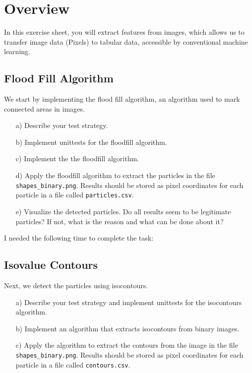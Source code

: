 \documentclass{article}
\begin{document}
\thispagestyle{page1} 

\section{Overview}

In this exercise sheet, you will extract features from images, which allows us to transfer image data (Pixels) to tabular data, accessible by conventional machine learning.

\subsection{Flood Fill Algorithm}

We start by implementing the flood fill algorithm, an algorithm used to mark connected areas in images. 

\begin{enumerate}

\item[a)] Describe your test strategy.

\item[b)] Implement unittests for the floodfill algorithm.

\item[c)] Implement the the floodfill algorithm.

\item[d)] Apply the floodfill algorithm to extract the particles in the file \texttt{shapes\_binary.png}. Results should be stored as pixel coordinates for each particle in a file called \texttt{particles.csv}.

\item[e)] Visualize the detected particles. Do all results seem to be legitimate particles? If not, what is the reason and what can be done about it?

\end{enumerate}

I needed the following time to complete the task:

\subsection{Isovalue Contours}

Next, we detect the particles using isocontours. 

\begin{enumerate}

\item[a)] Describe your test strategy and implement unittests for the isocontours algorithm.

\item[b)] Implement an algorithm that extracts isocontours from binary images. 

\item[c)] Apply the algorithm to extract the contours from the image in the file \texttt{shapes\_binary.png}. Results should be stored as pixel coordinates for each particle in a file called \texttt{contours.csv}.

\end{enumerate}
\end{document}
